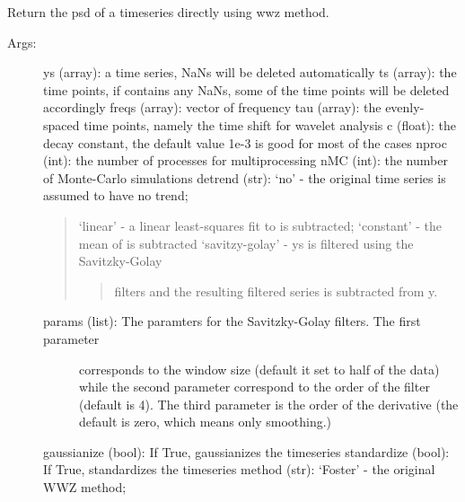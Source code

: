 \documentclass[letterpaper,10pt,english]{sphinxmanual}
\begin{document}
\begin{fulllineitems}
\label{\detokenize{Spectral:pyleoclim.Spectral.wwz_psd}}
Return the psd of a timeseries directly using wwz method.
\begin{description}
\item[{Args:}] \leavevmode
ys (array): a time series, NaNs will be deleted automatically
ts (array): the time points, if  contains any NaNs, some of the time points will be deleted accordingly
freqs (array): vector of frequency
tau (array): the evenly-spaced time points, namely the time shift for wavelet analysis
c (float): the decay constant, the default value 1e-3 is good for most of the cases
nproc (int): the number of processes for multiprocessing
nMC (int): the number of Monte-Carlo simulations
detrend (str): ‘no’ - the original time series is assumed to have no trend;
\begin{quote}

‘linear’ - a linear least-squares fit to  is subtracted;
‘constant’ - the mean of  is subtracted
‘savitzy-golay’ - ys is filtered using the Savitzky-Golay
\begin{quote}

filters and the resulting filtered series is subtracted from y.
\end{quote}
\end{quote}
\begin{description}
\item[{params (list): The paramters for the Savitzky-Golay filters. The first parameter}] \leavevmode
corresponds to the window size (default it set to half of the data)
while the second parameter correspond to the order of the filter
(default is 4). The third parameter is the order of the derivative
(the default is zero, which means only smoothing.)

\end{description}

gaussianize (bool): If True, gaussianizes the timeseries
standardize (bool): If True, standardizes the timeseries
method (str): ‘Foster’ - the original WWZ method;
\begin{quote}


\end{quote}
\end{description}
\end{fulllineitems}
\end{document}
